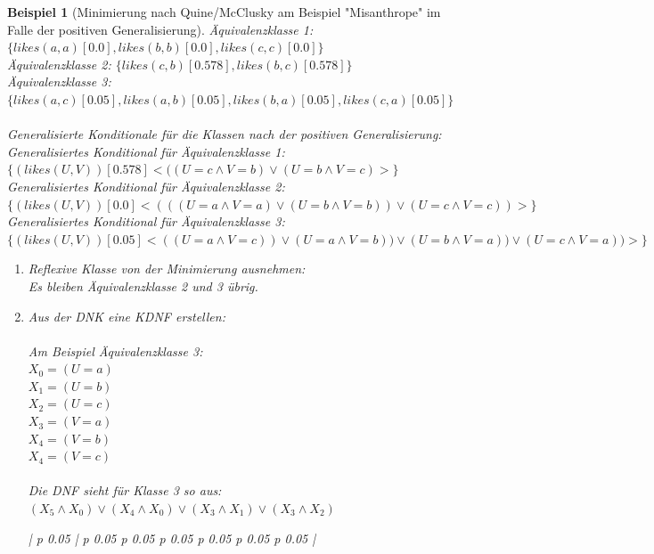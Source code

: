 \documentclass[a4paper, 11pt]{book}
\newtheorem{Bsp}{Beispiel}[section]
\newlength{\currentLongTableWidth} %
\begin{document}
\begin{Bsp}[Minimierung nach Quine/McClusky am Beispiel "{}Misanthrope"{} im Falle der positiven Generalisierung]
	Äquivalenzklasse 1: $ \{likes(a,a)[0.0], likes(b,b)[0.0], likes(c,c)[0.0]\} $\\
	Äquivalenzklasse 2: $ \{likes(c,b)[0.578], likes(b,c)[0.578]\} $\\
	Äquivalenzklasse 3: $ \{likes(a,c)[0.05], likes(a,b)[0.05], likes(b,a)[0.05], likes(c,a)[0.05]\} $\\
	\\
	\noindent
	Generalisierte Konditionale für die Klassen nach der positiven Generalisierung:\\
	Generalisiertes Konditional für Äquivalenzklasse 1: $ \{(likes(U,V))[0.578] <((U = c \land V = b) \lor (U = b \land V = c)>\} $\\
	Generalisiertes Konditional für Äquivalenzklasse 2: $ \{(likes(U,V))[0.0] <(((U = a \land V = a) \lor (U = b \land V = b)) \lor (U = c \land V = c)) >\} $\\
	Generalisiertes Konditional für Äquivalenzklasse 3: $ \{(likes(U,V))[0.05] <((U = a \land V = c)) \lor (U = a \land V = b)) \lor (U = b \land V = a)) \lor (U = c \land V = a))>\} $\\
	\begin{enumerate}
		\item Reflexive Klasse von der Minimierung ausnehmen:\\
		Es bleiben Äquivalenzklasse 2 und 3 übrig.	
		\item Aus der DNK eine KDNF erstellen:\\\\
		Am Beispiel Äquivalenzklasse 3:\\
		$ X_0 = (U = a) $\\
		$ X_1 = (U = b) $\\
		$ X_2 = (U = c) $\\
		$ X_3 = (V = a) $\\
		$ X_4 = (V = b) $\\
		$ X_4 = (V = c) $\\
		\\
		\noindent
		Die DNF sieht für Klasse 3 so aus:\\
		$ (X_5 \land X_0) \lor (X_4 \land X_0) \lor (X_3 \land X_1) \lor (X_3 \land X_2) $
		\begin{footnotesize}
			\begin{longtable}{ |  p {0.05\currentLongTableWidth} | p {0.05\currentLongTableWidth}  p {0.05\currentLongTableWidth}  p {0.05\currentLongTableWidth} p {0.05\currentLongTableWidth} p {0.05\currentLongTableWidth} p {0.05\currentLongTableWidth} |}

\end{longtable}
\end{footnotesize}
\end{enumerate}
\end{Bsp}
\end{document}
